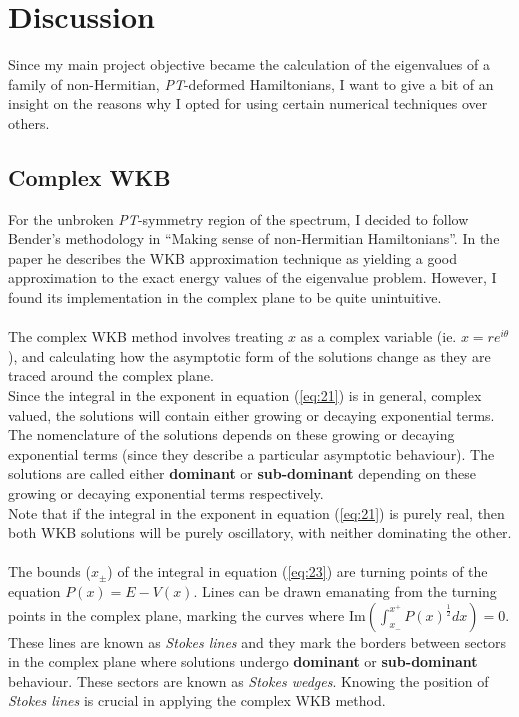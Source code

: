 \documentclass[10pt, a4paper, singlespacing]{report}
\newcommand\PT{\emph{PT}}
\begin{document}
\chapter{Discussion}\label{Discussion}
Since my main project objective became the calculation of the eigenvalues of a family of non-Hermitian, \PT-deformed Hamiltonians, I want to give a bit of an insight on the reasons why I opted for using certain numerical techniques over others.

\section{Complex WKB}\label{Complex WKB}
For the unbroken \PT-symmetry region of the spectrum, I decided to follow Bender's methodology in ``Making sense of non-Hermitian Hamiltonians''. In the paper he describes the WKB approximation technique as yielding a good approximation to the exact energy values of the eigenvalue problem. However, I found its implementation in the complex plane to be quite unintuitive.\\\\
The complex WKB method involves treating $x$ as a complex variable (ie. $x = re^{i\theta}$), and calculating how the asymptotic form of the solutions change as they are traced around the complex plane\cite{Sorrell}.\\
Since the integral in the exponent in equation (\ref{eq:21}) is in general, complex valued, the solutions will contain either growing or decaying exponential terms. The nomenclature of the solutions depends on these growing or decaying exponential terms (since they describe a particular asymptotic behaviour). The solutions are called either \textbf{dominant} or \textbf{sub-dominant} depending on these growing or decaying exponential terms respectively.\\
Note that if the integral in the exponent in equation (\ref{eq:21}) is purely real, then both WKB solutions will be purely oscillatory, with neither dominating the other\cite{Sorrell}.\\\\
The bounds ($x_{\pm}$) of the integral in equation (\ref{eq:23}) are turning points of the equation $P(x) = E - V(x)$. Lines can be drawn emanating from the turning points in the complex plane, marking the curves where $\mathrm{Im}(\int_{x_-}^{x^+} P(x)^{\frac{1}{2}}dx) = 0$. These lines are known as \emph{Stokes lines} and they mark the borders between sectors in the complex plane where solutions undergo \textbf{dominant} or \textbf{sub-dominant} behaviour. These sectors are known as \emph{Stokes wedges}. Knowing the position of \emph{Stokes lines} is crucial in applying the complex WKB method\cite{Sorrell}.
\end{document}
